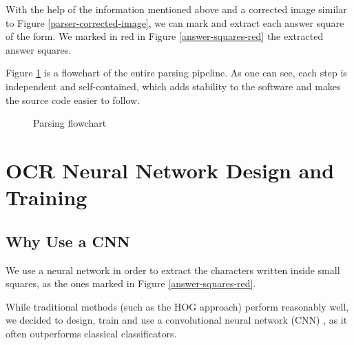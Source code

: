 \documentclass[11pt, a4paper]{report}
\begin{document}
With the help of the information mentioned above and a corrected image similar to Figure \ref{parser-corrected-image}, we can mark and extract each answer square of the form. We marked in red in Figure \ref{answer-squares-red} the extracted answer squares.

Figure \ref{parsing-flow} is a flowchart of the entire parsing pipeline. As one can see, each step is independent and self-contained, which adds stability to the software and makes the source code easier to follow. 

\begin{figure}[!h]
	\centering
	\caption{Parsing flowchart}
	\label{parsing-flow}
\end{figure}



\chapter{OCR Neural Network Design and Training}
\label{chapter-ocr-neural-network}

\section{Why Use a CNN}

We use a neural network in order to extract the characters written inside small squares, as the ones marked in Figure \ref{answer-squares-red}.

While traditional methods (such as the HOG \cite{HOG} approach) perform reasonably well, we decided to design, train and use a convolutional neural network (CNN) \cite{CNN}, as it often outperforms classical classificators.
\end{document}
